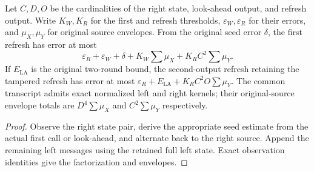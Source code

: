 \begin{theorem}
  \label{thm:lowerbounds-algebraic-lookahead-refresh}
  \leanok
  Let $C,D,O$ be the cardinalities of the right state, look-ahead output,
  and refresh output. Write $K_W,K_R$ for the first and refresh thresholds,
  $\varepsilon_W,\varepsilon_R$ for their errors, and $\mu_X,\mu_Y$
  for original source envelopes. From the original seed error $\delta$,
  the first refresh has error at most
  \[
    \varepsilon_R+\varepsilon_W+\delta+
      K_W\sum\mu_X+K_RC^2\sum\mu_Y.
  \]
  If $E_{\mathrm{LA}}$ is the original two-round bound, the second-output
  refresh retaining the tampered refresh has error at most
  $\varepsilon_R+E_{\mathrm{LA}}+K_RC^2O\sum\mu_Y$.
  The common transcript admits exact normalized left and right kernels;
  their original-source envelope totals are $D^4\sum\mu_X$ and
  $C^2\sum\mu_Y$ respectively.
\end{theorem}
\begin{proof}
  \leanok
  Observe the right state pair, derive the appropriate seed estimate from
  the actual first call or look-ahead, and alternate back to the right
  source. Append the remaining left messages using the retained full left
  state. Exact observation identities give the factorization and envelopes.
\end{proof}

